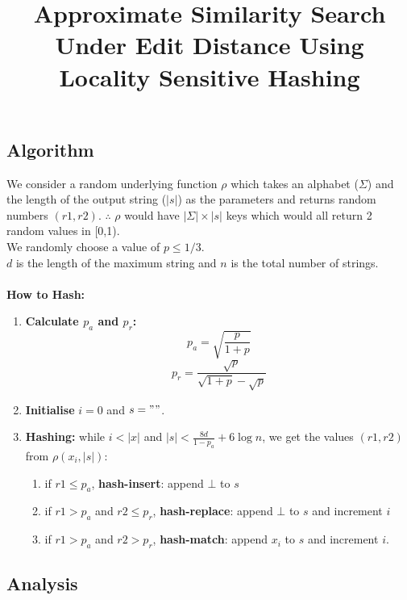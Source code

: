 \documentclass{article}
\title{Approximate Similarity Search Under Edit Distance Using Locality Sensitive Hashing}
\author{}
\date{}
\begin{document}
\maketitle

\subsection*{Algorithm}
We consider a random underlying function $\rho$ which takes an alphabet ($\Sigma$)
and the length of the output string ($|s|$) as the parameters and returns random
numbers $(r1,r2)$. $\therefore$ $\rho$ would have $|\Sigma|\times|s|$ keys which would
all return 2 random values in [0,1).\\
We randomly choose a value of $p\leq 1/3$.\\
$d$ is the length of the maximum string and $n$ is the total number of strings.
\\
\\
\textbf{How to Hash:}
\begin{enumerate}
    \item \textbf{Calculate $p_a$ and $p_r$:} \\
    $$p_a=\sqrt{\frac{p}{1+p}}$$
    $$p_r=\frac{\sqrt{p}}{\sqrt{1+p}-\sqrt{p}}$$
    \item \textbf{Initialise} $i=0$ and $s=""$.
    \item \textbf{Hashing:} while $i<|x|$ and $|s|<\frac{8d}{1-p_a}+6\log n$, we
    get the values $(r1,r2)$ from $\rho(x_i,|s|)$:
    \begin{enumerate}
        \item if $r1\leq p_a$, \textbf{hash-insert}: append $\bot$ to $s$
        \item if $r1>p_a$ and $r2\leq p_r$, \textbf{hash-replace}: append $\bot$ to 
        $s$ and increment $i$
        \item if $r1>p_a$ and $r2>p_r$, \textbf{hash-match}: append $x_i$ to $s$ and
        increment $i$.
    \end{enumerate}
\end{enumerate}

\subsection*{Analysis}
\end{document}

